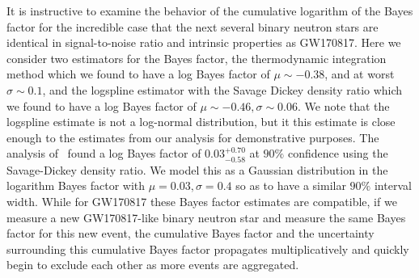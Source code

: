 It is instructive to examine the behavior of the cumulative logarithm of the Bayes factor for the incredible case that the next several binary neutron stars are identical in signal-to-noise ratio and intrinsic properties as GW170817. Here we consider two estimators for the Bayes factor, the thermodynamic integration method which we found to have a log Bayes factor of $\mu \sim -0.38$, and at worst $\sigma \sim 0.1$, and the logspline estimator with the Savage Dickey density ratio which we found to have a log Bayes factor of $\mu \sim -0.46, \sigma \sim 0.06$. We note that the logspline estimate is not a log-normal distribution, but it this estimate is close enough to the estimates from our analysis for demonstrative purposes. The analysis of~\cite{abbott2019constraining} found a log Bayes factor of $0.03^{+0.70}_{-0.58}$ at $90 \%$ confidence using the Savage-Dickey density ratio. We model this as a Gaussian distribution in the logarithm Bayes factor with $\mu = 0.03, \sigma = 0.4$ so as to have a similar $90\%$ interval width. While for GW170817 these Bayes factor estimates are compatible, if we measure a new GW170817-like binary neutron star and measure the same Bayes factor for this new event, the cumulative Bayes factor and the uncertainty surrounding this cumulative Bayes factor propagates multiplicatively and quickly begin to exclude each other as more events are aggregated.

